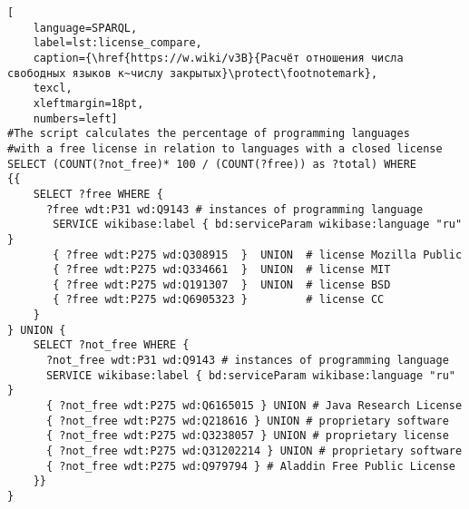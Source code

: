 \newpage
{}
\begin{lstlisting}[
	language=SPARQL,
	label=lst:license_compare,
	caption={\href{https://w.wiki/v3B}{Расчёт отношения числа свободных языков к~числу закрытых}\protect\footnotemark},
	texcl,
    xleftmargin=18pt, 
    numbers=left]
#The script calculates the percentage of programming languages 
#with a free license in relation to languages with a closed license
SELECT (COUNT(?not_free)* 100 / (COUNT(?free)) as ?total) WHERE
{{
    SELECT ?free WHERE {
      ?free wdt:P31 wd:Q9143 # instances of programming language
       SERVICE wikibase:label { bd:serviceParam wikibase:language "ru" }
       { ?free wdt:P275 wd:Q308915  }  UNION  # license Mozilla Public
       { ?free wdt:P275 wd:Q334661  }  UNION  # license MIT
       { ?free wdt:P275 wd:Q191307  }  UNION  # license BSD
       { ?free wdt:P275 wd:Q6905323 }         # license CC
    }
} UNION {
    SELECT ?not_free WHERE {
      ?not_free wdt:P31 wd:Q9143 # instances of programming language
      SERVICE wikibase:label { bd:serviceParam wikibase:language "ru" }
      { ?not_free wdt:P275 wd:Q6165015 } UNION # Java Research License
      { ?not_free wdt:P275 wd:Q218616 } UNION # proprietary software
      { ?not_free wdt:P275 wd:Q3238057 } UNION # proprietary license 
      { ?not_free wdt:P275 wd:Q31202214 } UNION # proprietary software 
      { ?not_free wdt:P275 wd:Q979794 } # Aladdin Free Public License
    }}
}
\end{lstlisting}%






